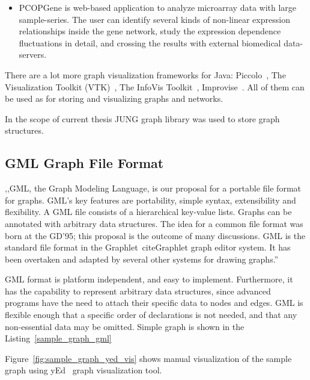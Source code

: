 \begin{enumerate}
\begin{itemize}
\item PCOPGene is web-based application to analyze microarray data with large sample-series. The user can identify several kinds of non-linear expression relationships inside the gene network, study the expression dependence fluctuations in detail, and crossing the results with external biomedical data-servers.~\cite{PCOPGENE}

\end{itemize}

\end{enumerate}

There are a lot more graph visualization frameworks for Java: Piccolo~\cite{Piccolo}, The Visualization Toolkit (VTK)~\cite{VTK}, The InfoVis Toolkit~\cite{InfoVis_Toolkit}, Improvise~\cite{Improvise}. All of them can be used as for storing and visualizing graphs and networks.


In the scope of current thesis JUNG graph library was used to store graph structures.

\subsection{GML Graph File Format}
 ,,GML, the Graph Modeling Language, is our proposal for a portable file format for graphs. GML's key features are portability, simple syntax, extensibility and flexibility. A GML file consists of a hierarchical key-value lists. Graphs can be annotated with arbitrary data structures. The idea for a common file format was born at the GD'95; this proposal is the outcome of many discussions. GML is the standard file format in the Graphlet~cite{Graphlet} graph editor system. It has been overtaken and adapted by several other systems for drawing graphs.''~\cite{GML}


GML format is platform independent, and easy to implement. Furthermore, it has the capability to represent arbitrary data structures, since advanced programs have the need to attach their specific data to nodes and edges. GML is flexible enough that a specific order of declarations is not needed, and that any non-essential data may be omitted. Simple graph is shown in the Listing~\ref{sample_graph_gml}

\begin{center}
	
\end{center}

Figure~\ref{fig:sample_graph_yed_vis} shows manual visualization of the sample graph using yEd~\cite{yed} graph visualization tool.

